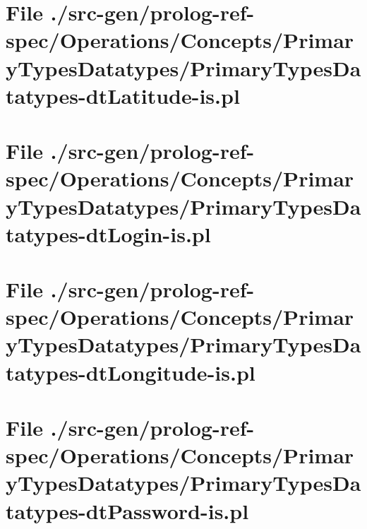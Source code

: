\section[File /src-gen/prolog-ref-spec.../PrimaryTypesDatatypes-dtLatitude-is.pl]{File ./src-gen/prolog-ref-spec/Operations/Concepts/PrimaryTypesDatatypes/PrimaryTypesDatatypes-dtLatitude-is.pl}
\scriptsize

\normalsize
	
\section[File /src-gen/prolog-ref-spec/Operations.../PrimaryTypesDatatypes-dtLogin-is.pl]{File ./src-gen/prolog-ref-spec/Operations/Concepts/PrimaryTypesDatatypes/PrimaryTypesDatatypes-dtLogin-is.pl}
\scriptsize

\normalsize
	
\section[File /src-gen/prolog-ref-spec.../PrimaryTypesDatatypes-dtLongitude-is.pl]{File ./src-gen/prolog-ref-spec/Operations/Concepts/PrimaryTypesDatatypes/PrimaryTypesDatatypes-dtLongitude-is.pl}
\scriptsize

\normalsize
	
\section[File /src-gen/prolog-ref-spec.../PrimaryTypesDatatypes-dtPassword-is.pl]{File ./src-gen/prolog-ref-spec/Operations/Concepts/PrimaryTypesDatatypes/PrimaryTypesDatatypes-dtPassword-is.pl}
\scriptsize

\normalsize
	
